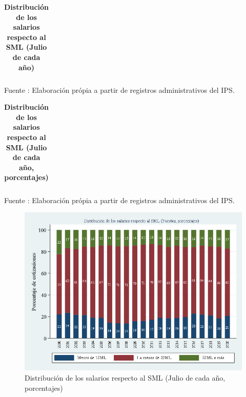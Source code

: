 \begin{table}[H]
\begin{center}
\scriptsize     
\caption{\bf{Distribución de los salarios respecto al SML (Julio de cada año)}}
\begin{tabular}{l|rrrrrrrrrrrrr}

\end{tabular}
                    \item Fuente : Elaboración própia a partir de registros administrativos del IPS.
\end{center}
\end{table}

\begin{table}[H]
\begin{center}
\scriptsize     
\caption{\bf{Distribución de los salarios respecto al SML (Julio de cada año, porcentajes)}}
\begin{tabular}{l|rrrrrrrrrrrrr}

\end{tabular}
                    \item Fuente : Elaboración própia a partir de registros administrativos del IPS.
\end{center}
\end{table}

\begin{figure}[H]
\begin{center}
                    \caption{Distribución de los salarios respecto al SML (Julio de cada año, porcentajes)}
                    \vspace{0.5cm}
                    \includegraphics[scale=0.6]{RA_IPS_dist_salarial_puestos_2010a2020_mes_porcentajes.png}
\end{center}
\end{figure}

